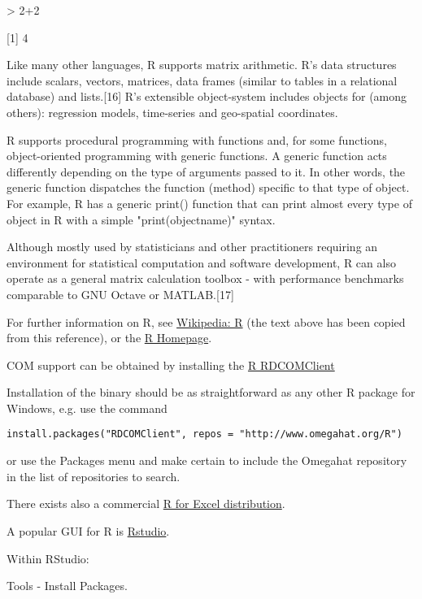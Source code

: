 > 2+2

[1] 4

\vpara
Like many other languages, R supports matrix arithmetic. R's data structures include scalars, vectors, matrices, data frames (similar to tables in a relational database) and lists.[16] R's extensible object-system includes objects for (among others): regression models, time-series and geo-spatial coordinates.

\vpara
R supports procedural programming with functions and, for some functions, object-oriented programming with generic functions. A generic function acts differently depending on the type of arguments passed to it. In other words, the generic function dispatches the function (method) specific to that type of object. For example, R has a generic print() function that can print almost every type of object in R with a simple "print(objectname)" syntax.

\vpara
Although mostly used by statisticians and other practitioners requiring an environment for statistical computation and software development, R can also operate as a general matrix calculation toolbox - with performance benchmarks comparable to GNU Octave or MATLAB.[17]

\vpara
For further information on R, see \href{http://en.wikipedia.org/wiki/R_(programming_language)}{Wikipedia: R} (the text above has been copied from this reference), or the  \href{http://www.r-project.org/}{R Homepage}.

\vpara
COM support can be obtained by installing the \href{http://www.omegahat.org/RDCOMClient/}{R RDCOMClient} 

Installation of the binary should be as straightforward as any other R package for Windows, e.g. use the command 

\begin{verbatim} 
install.packages("RDCOMClient", repos = "http://www.omegahat.org/R")
\end{verbatim}

or use the Packages menu and make certain to include the Omegahat repository in the list of repositories to search. 

There exists also a commercial \href{http://rcom.univie.ac.at/main.html}{R for Excel distribution}.

\vpara
A popular GUI for R is \href{http://www.rstudio.com/}{Rstudio}.

Within RStudio:

Tools - Install Packages.


